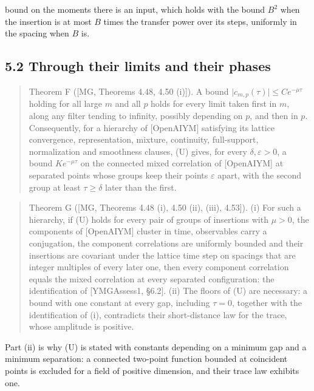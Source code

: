 \documentclass[10pt,letterpaper,twocolumn]{article}
\begin{document}
bound on the moments there is an input, which holds with the bound \(B^2\) when the insertion is at most \(B\) times the transfer power over its steps, uniformly in the spacing when \(B\) is.

\subsection{5.2 Through their limits and their phases}\label{52-through-their-limits-and-their-phases}

\begin{quote}
Theorem F ({[}MG, Theorems 4.48, 4.50 (i){]}). A bound \(\lvert c_{m,p}(\tau)\rvert\le Ce^{-\mu\tau}\) holding for all large \(m\) and all \(p\) holds for every limit taken first in \(m\), along any filter tending to infinity, possibly depending on \(p\), and then in \(p\). Consequently, for a hierarchy of {[}OpenAIYM{]} satisfying its lattice convergence, representation, mixture, continuity, full-support, normalization and smoothness clauses, (U) gives, for every \(\delta,\varepsilon>0\), a bound \(Ke^{-\mu\tau}\) on the connected mixed correlation of {[}OpenAIYM{]} at separated points whose groups keep their points \(\varepsilon\) apart, with the second group at least \(\tau\ge\delta\) later than the first.
\end{quote}

\begin{quote}
Theorem G ({[}MG, Theorems 4.48 (i), 4.50 (ii), (iii), 4.53{]}). (i) For such a hierarchy, if (U) holds for every pair of groups of insertions with \(\mu>0\), the components of {[}OpenAIYM{]} cluster in time, observables carry a conjugation, the component correlations are uniformly bounded and their insertions are covariant under the lattice time step on spacings that are integer multiples of every later one, then every component correlation equals the mixed correlation at every separated configuration: the identification of {[}YMGAssess1, §6.2{]}. (ii) The floors of (U) are necessary: a bound with one constant at every gap, including \(\tau=0\), together with the identification of (i), contradicts their short-distance law for the trace, whose amplitude is positive.
\end{quote}

Part (ii) is why (U) is stated with constants depending on a minimum gap and a minimum separation: a connected two-point function bounded at coincident points is excluded for a field of positive dimension, and their trace law exhibits one.
\end{document}
